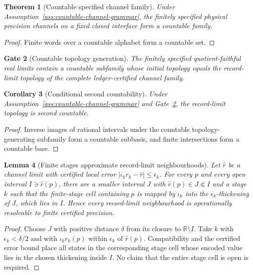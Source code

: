 \documentclass[11pt]{article}
\newtheorem{theorem}{Theorem}[section]
\newtheorem{lemma}[theorem]{Lemma}
\newtheorem{corollary}[theorem]{Corollary}
\newtheorem{gate}[theorem]{Gate}
\theoremstyle{remark}
\begin{document}
\begin{theorem}[Countable specified channel family]
\label{thm:countable-channel-family}
Under Assumption~\ref{ass:countable-channel-grammar}, the finitely specified
physical precision channels on a fixed closed interface form a countable family.
\end{theorem}
\begin{proof}
Finite words over a countable alphabet form a countable set.
\end{proof}

\begin{gate}[Countable topology generation]
\label{gate:countable-topology-generation}
The finitely specified quotient-faithful real limits contain a countable
subfamily whose initial topology equals the record-limit topology of the
complete ledger-certified channel family.
\end{gate}

\begin{corollary}[Conditional second countability]
\label{prop:record-second-countable}
Under Assumption~\ref{ass:countable-channel-grammar} and
Gate~\ref{gate:countable-topology-generation}, the record-limit topology is
second countable.
\end{corollary}
\begin{proof}
Inverse images of rational intervals under the countable topology-generating
subfamily form a countable subbasis, and finite intersections form a countable
base.
\end{proof}

\begin{lemma}[Finite stages approximate record-limit neighbourhoods]
\label{lem:uniform-limits-no-refinement}
Let $\widehat r$ be a channel limit with certified local error
$|\iota_k r_k-\widehat r|\le\epsilon_k$.  For every $p$ and every open interval
$I\ni\widehat r(p)$, there are a smaller interval $J$ with
$\widehat r(p)\in J\Subset I$ and a stage $k$ such that the finite-stage cell
containing $p$ is mapped by $\iota_k$ into the $\epsilon_k$-thickening of $J$,
which lies in $I$.  Hence every record-limit neighbourhood is operationally
resolvable to finite certified precision.
\end{lemma}

\begin{proof}
Choose $J$ with positive distance $\delta$ from its closure to
$\mathbb R\setminus I$.  Take $k$ with $\epsilon_k<\delta/2$ and with
$\iota_k r_k(p)$ within $\epsilon_k$ of $\widehat r(p)$.  Compatibility and
the certified error bound place all states in the corresponding stage cell
whose encoded value lies in the chosen thickening inside $I$.  No claim that
the entire stage cell is open is required.
\end{proof}
\end{document}

